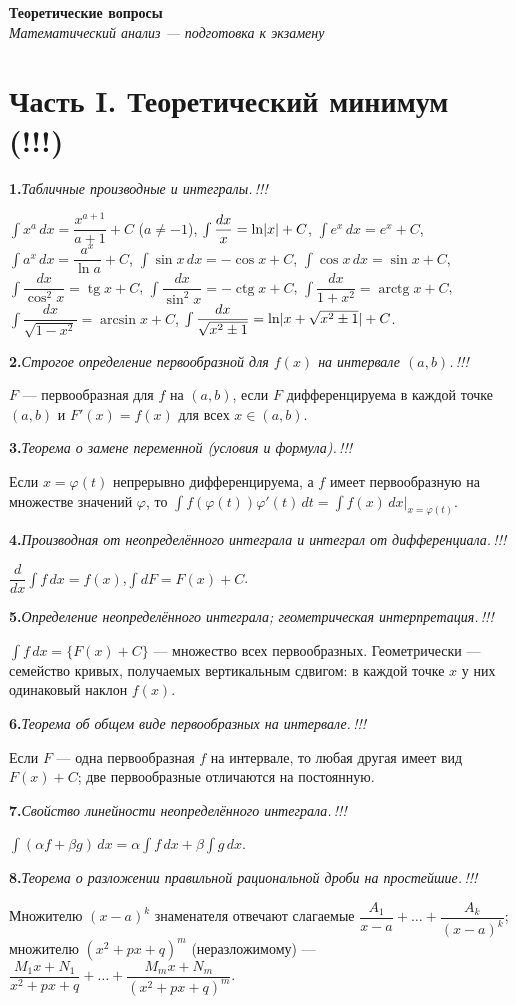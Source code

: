 \documentclass[10pt,a4paper]{article}
\newcommand{\coursename}{Математический анализ — подготовка к экзамену}
\newcommand{\doctitle}{Теоретические вопросы}
\DeclareMathOperator{\tg}{tg}
\DeclareMathOperator{\ctg}{ctg}
\DeclareMathOperator{\arctg}{arctg}
\newcommand{\dx}{\,dx}
\newcommand{\dt}{\,dt}
\DeclarePairedDelimiter{\abs}{\lvert}{\rvert}
\theoremstyle{definition}
\theoremstyle{plain}
\newcommand{\writespace}{\vspace{7.5mm}}
\newcommand{\tm}{\textcolor{teormin}{\,!!!}}
\newcommand{\faq}[3]{%
  \par\smallskip\noindent
  \textbf{#1.}\enspace\textit{#2}\par
  \nobreak\vspace{0.3ex}\noindent #3\par
  \writespace}
\begin{document}
\begin{center}
  {\LARGE\bfseries \doctitle}\\[3pt]
  {\large\itshape \coursename}
\end{center}
\vspace{4pt}

\section{Часть I. Теоретический минимум \texorpdfstring{\textcolor{teormin}{(!!!)}}{(!!!)}}

\faq{1}{Табличные производные и интегралы.\tm}{%
$\int x^a\dx=\dfrac{x^{a+1}}{a+1}+C$ ($a\ne-1$),\;
$\int\dfrac{dx}{x}=\ln\abs{x}+C$,\;
$\int e^x\dx=e^x+C$,\;
$\int a^x\dx=\dfrac{a^x}{\ln a}+C$,\;
$\int\sin x\dx=-\cos x+C$,\;
$\int\cos x\dx=\sin x+C$,\;
$\int\dfrac{dx}{\cos^2x}=\tg x+C$,\;
$\int\dfrac{dx}{\sin^2x}=-\ctg x+C$,\;
$\int\dfrac{dx}{1+x^2}=\arctg x+C$,\;
$\int\dfrac{dx}{\sqrt{1-x^2}}=\arcsin x+C$,\;
$\int\dfrac{dx}{\sqrt{x^2\pm1}}=\ln\abs{x+\sqrt{x^2\pm1}}+C$.}

\faq{2}{Строгое определение первообразной для $f(x)$ на интервале $(a,b)$.\tm}{%
$F$ — первообразная для $f$ на $(a,b)$, если $F$ дифференцируема в каждой точке $(a,b)$ и
$F'(x)=f(x)$ для всех $x\in(a,b)$.}

\faq{3}{Теорема о замене переменной (условия и формула).\tm}{%
Если $x=\varphi(t)$ непрерывно дифференцируема, а $f$ имеет первообразную на множестве значений
$\varphi$, то $\displaystyle\int f(\varphi(t))\varphi'(t)\dt=\int f(x)\dx\big|_{x=\varphi(t)}$.}

\faq{4}{Производная от неопределённого интеграла и интеграл от дифференциала.\tm}{%
$\dfrac{d}{dx}\displaystyle\int f\dx=f(x)$,\quad $\displaystyle\int dF=F(x)+C$.}

\faq{5}{Определение неопределённого интеграла; геометрическая интерпретация.\tm}{%
$\int f\dx=\{F(x)+C\}$ — множество всех первообразных. Геометрически — семейство кривых, получаемых
вертикальным сдвигом: в каждой точке $x$ у них одинаковый наклон $f(x)$.}

\faq{6}{Теорема об общем виде первообразных на интервале.\tm}{%
Если $F$ — одна первообразная $f$ на интервале, то любая другая имеет вид $F(x)+C$; две
первообразные отличаются на постоянную.}

\faq{7}{Свойство линейности неопределённого интеграла.\tm}{%
$\int(\alpha f+\beta g)\dx=\alpha\int f\dx+\beta\int g\dx$.}

\faq{8}{Теорема о разложении правильной рациональной дроби на простейшие.\tm}{%
Множителю $(x-a)^k$ знаменателя отвечают слагаемые $\dfrac{A_1}{x-a}+\dots+\dfrac{A_k}{(x-a)^k}$;
множителю $(x^2+px+q)^m$ (неразложимому) — $\dfrac{M_1x+N_1}{x^2+px+q}+\dots+\dfrac{M_mx+N_m}{(x^2+px+q)^m}$.}
\end{document}
